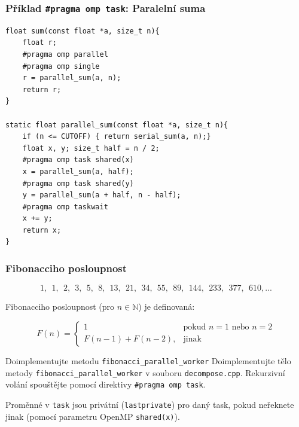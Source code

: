 \documentclass[usenames,dvipsnames,9pt]{beamer}
\begin{document}
\begin{frame}[fragile]
\frametitle{Příklad \texttt{\#pragma omp task}: Paralelní suma}

\begin{verbatim}
float sum(const float *a, size_t n){
    float r;
    #pragma omp parallel
    #pragma omp single
    r = parallel_sum(a, n);
    return r;
}

static float parallel_sum(const float *a, size_t n){
    if (n <= CUTOFF) { return serial_sum(a, n);}
    float x, y;	size_t half = n / 2;
    #pragma omp task shared(x)
    x = parallel_sum(a, half);
    #pragma omp task shared(y)
    y = parallel_sum(a + half, n - half);
    #pragma omp taskwait
    x += y;
    return x;
}
  \end{verbatim}
  
\end{frame}


{
\begin{frame}[fragile]
\frametitle{Fibonacciho posloupnost}

\[
1,\ \  1,\ \  2,\ \  3,\ \  5,\ \  8,\ \  13,\ \  21,\ \  34,\ \  55,\ \  89,\ \  144,\ \  233,\ \  377,\ \  610, ...
\]

Fibonacciho posloupnost (pro $n \in \mathbb{N}$) je definovaná:

\[
F(n) = 
\begin{cases}
      1 & \text{pokud $n = 1$ nebo $n=2$} \\
      F(n-1) + F(n-2), & \text{jinak}
    \end{cases}
\]

\vspace{2em}

	\pause

  \begin{block}{Doimplementujte metodu \texttt{fibonacci\_parallel\_worker}}
    Doimplementujte tělo metody \texttt{fibonacci\_parallel\_worker} v souboru \texttt{decompose.cpp}.
    Rekurzivní volání spouštějte pomocí direktivy \texttt{\#pragma omp task}.
  \end{block}

  \begin{center}
  	\large \faWarning \hspace{3pt} Proměnné v \texttt{task} jsou privátní (\texttt{lastprivate}) pro daný task, pokud neřeknete jinak (pomocí parametru OpenMP \texttt{shared(x)}).
  \end{center}
\end{frame}
}
\end{document}
